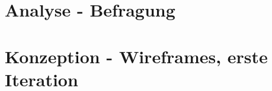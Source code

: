 \chapter{Analyse - Befragung}\label{analyse_umfrage}



\chapter{Konzeption - Wireframes, erste Iteration}\label{app_wireframes}
